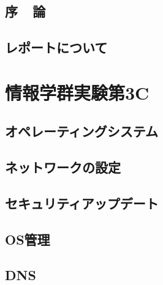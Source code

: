 \documentclass[10pt]{text2002}
\title{}
\author{}
\date{}
\begin{document}
\sloppy
\maketitle
\chapter*{序~~論}\label{chapter:introduction}

\clearpage
\chapter*{レポートについて}\label{chapter:report}

 \tableofcontents
\clearpage


\part{情報学群実験第3C}\label{part:1}

\chapter{オペレーティングシステム}\label{ch:os}


\chapter{ネットワークの設定}\label{ch:nwconfig}


\chapter{セキュリティアップデート}\label{ch:patch}


\chapter{OS管理}\label{ch:osadmin}


\chapter{DNS}\label{ch:dns}

\end{document}
